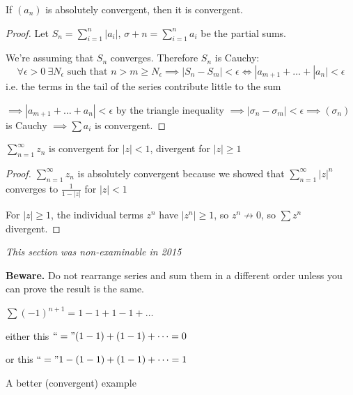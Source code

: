 \documentclass[twoside]{scrartcl}
\begin{document}
\begin{theorem}
	If $(a_n)$ is absolutely convergent, then it is convergent.
\end{theorem}

\begin{proof}
Let $S_n = \sum_{i=1}^{n} |a_i|$, $\sigma+n = \sum_{i=1}^n a_i$ be the partial sums.

We're assuming that $S_n$ converges. Therefore $S_n$ is Cauchy: 
\[ \forall \epsilon >0~ \exists N_{\epsilon}\text{ such that }n > m \geq N_{\epsilon} \implies |S_n - S_m| < \epsilon \iff |a_{m+1} + \dots + |a_n| < \epsilon\]
i.e. the terms in the tail of the series contribute little to the sum 

$\implies |a_{m+1} + \dots + a_n| < \epsilon$ by the triangle inequality $\implies |\sigma_n - \sigma_m| < \epsilon \implies (\sigma_n)$ is Cauchy $\implies \sum a_i$ is convergent.
\end{proof}\vspace*{5pt}

\begin{example}
$\sum_{n=1}^{\infty} z_n$ is convergent for $|z| < 1$, divergent for $|z| \geq 1$
\begin{proof}
$\sum_{n=1}^{\infty} z_n$ is absolutely convergent because we showed that $\sum_{n=1}^{\infty} |z|^n$ converges to $\frac{1}{1 - |z|}$ for $|z| < 1$	

For $|z| \geq 1$, the individual terms $z^n$ have $|z^n| \geq 1$, so $z^n \not\to 0$, so $\sum z^n$ divergent.
\end{proof}
\end{example}


\emph{This section was non-examinable in 2015}

\textbf{Beware.} Do not rearrange series and sum them in a different order unless you can prove the result is the same.\\

\begin{example}
$\sum (-1)^{n+1} = 1 - 1 + 1 - 1 + \dots$

either this $``=" (1-1) + (1-1) + \dots = 0$

or this $``=" 1 - (1-1) + (1-1) + \dots = 1$	
\end{example}

A better (convergent) example\\
\end{document}

